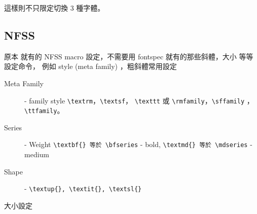   這樣則不只限定切換 3 種字體。

  \subsection{NFSS}
  原本 \LaTeXe{} 就有的 NFSS macro 設定，不需要用 fontspec 就有的那些斜體，大小
  等等設定命令， 例如 style (meta family) ，粗斜體常用設定

  \begin{description}
    \item [Meta Family] - family style \verb=\textrm=，\verb=\textsf=，
      \verb=\texttt= 或 \verb=\rmfamily=，\verb=\sffamily= ，\verb=\ttfamily=。
    \item [Series] - Weight \verb=\textbf{} 等於 \bfseries= - bold,
                     \verb=\textmd{} 等於 \mdseries= - medium
    \item [Shape] - \verb=\textup{}, \textit{}, \textsl{}=
  \end{description}

  大小設定

